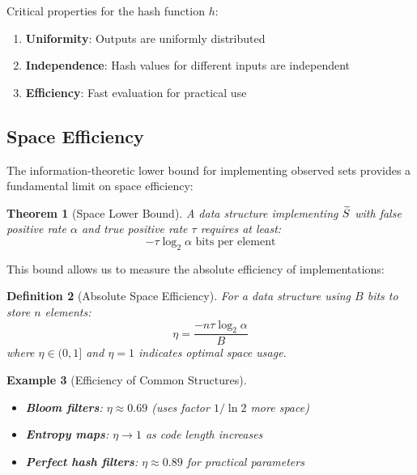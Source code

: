\documentclass[11pt,final,hidelinks]{article}
\newtheorem{theorem}{Theorem}[section]
\newtheorem{definition}[theorem]{Definition}
\newtheorem{example}[theorem]{Example}
\begin{document}
Critical properties for the hash function $h$:
\begin{enumerate}
    \item \textbf{Uniformity}: Outputs are uniformly distributed
    \item \textbf{Independence}: Hash values for different inputs are independent
    \item \textbf{Efficiency}: Fast evaluation for practical use
\end{enumerate}

\subsection{Space Efficiency}

The information-theoretic lower bound for implementing observed sets provides a fundamental limit on space efficiency:

\begin{theorem}[Space Lower Bound]
A data structure implementing $\widetilde{S}$ with false positive rate $\alpha$ and true positive rate $\tau$ requires at least:
\begin{equation}
-\tau \log_2 \alpha \text{ bits per element}
\end{equation}
\end{theorem}

This bound allows us to measure the absolute efficiency of implementations:

\begin{definition}[Absolute Space Efficiency]
For a data structure using $B$ bits to store $n$ elements:
\begin{equation}
\eta = \frac{-n\tau \log_2 \alpha}{B}
\end{equation}
where $\eta \in (0, 1]$ and $\eta = 1$ indicates optimal space usage.
\end{definition}

\begin{example}[Efficiency of Common Structures]
\begin{itemize}
    \item \textbf{Bloom filters}: $\eta \approx 0.69$ (uses factor $1/\ln 2$ more space)
    \item \textbf{Entropy maps}: $\eta \to 1$ as code length increases
    \item \textbf{Perfect hash filters}: $\eta \approx 0.89$ for practical parameters
\end{itemize}
\end{example}
\end{document}
